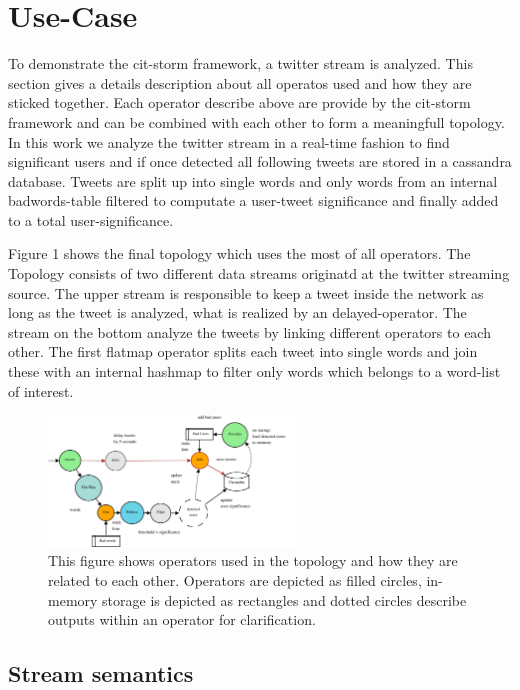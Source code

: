 \section{Use-Case}
\label{sect:useCase}

To demonstrate the cit-storm framework, a twitter stream is analyzed. This section gives a details description about all operatos used and how they are sticked together. Each operator describe above are provide by the cit-storm framework and can be combined with each other to form a meaningfull topology. In this work we analyze the twitter stream in a real-time fashion to find significant users and if once detected all following tweets are stored in a cassandra database. Tweets are split up into single words and only words from an internal badwords-table filtered to computate a user-tweet significance and finally added to a total user-significance. \newline

Figure 1 shows the final topology which uses the most of all operators. The Topology consists of two different data streams originatd at the twitter streaming source. The upper stream is responsible to keep a tweet inside the network as long as the tweet is analyzed, what is realized by an delayed-operator. The stream on the bottom analyze the tweets by linking different operators to each other. The first flatmap operator splits each tweet into single words and join these with an internal hashmap to filter only words which belongs to a word-list of interest.

\begin{figure}[h]
  \centering
  \includegraphics[width=0.6\textwidth]{images/AnalyzeTweetsTopology-eps-converted-to.pdf}
  \caption{This figure shows operators used in the topology and how they are related to each other. Operators are depicted as filled circles, in-memory storage is depicted as rectangles and dotted circles describe outputs within an operator for clarification.}
\end{figure}

\subsection{Stream semantics}

